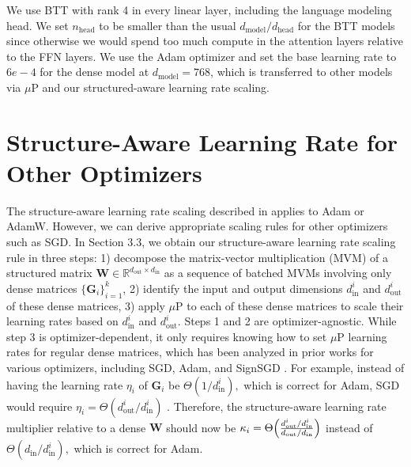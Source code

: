 \documentclass{article}
\newcommand{\mbf}[1]{{\boldsymbol{\mathbf{#1}}}}
\newcommand{\bm}{\mbf}
\theoremstyle{plain}
\theoremstyle{definition}
\theoremstyle{remark}
\newcommand{\mup}{$\mu$P\xspace}
\newcommand{\R}{\mathbb{R}}
\newcommand{\din}{{d_\mathrm{in}}}
\newcommand{\dout}{{d_\mathrm{out}}}
\begin{document}
We use BTT with rank 4 in every linear layer, including the language modeling head. We set $n_\mathrm{head}$ to be smaller than the usual $d_\mathrm{model} / d_\mathrm{head}$ for the BTT models since otherwise we would spend too much compute in the attention layers relative to the FFN layers.  We use the Adam optimizer and set the base learning rate to $6e-4$ for the dense model at $d_\mathrm{model}=768$, which is transferred to other models via \mup and our structured-aware learning rate scaling.

\section{Structure-Aware Learning Rate for Other Optimizers} \label{app:other_opt}
The structure-aware learning rate scaling described in  applies to Adam or AdamW. However, we can derive appropriate scaling rules for other optimizers such as SGD. In Section 3.3, we obtain our structure-aware learning rate scaling rule in three steps: 1) decompose the matrix-vector multiplication (MVM) of a structured matrix $\bm{W} \in \R^{\dout \times \din}$ as a sequence of batched MVMs involving only dense matrices $\{\bm{G}_i\}_{i=1}^{k}$, 2) identify the input and output dimensions $d^i_\mathrm{in}$ and $d^i_\mathrm{out}$  of these dense matrices, 3) apply \mup to each of these dense matrices to scale their learning rates based on $d^i_\mathrm{in}$ and $d^i_\mathrm{out}$. Steps 1 and 2 are optimizer-agnostic. While step 3 is optimizer-dependent, it only requires knowing how to set \mup learning rates for regular dense matrices, which has been analyzed in prior works for various optimizers, including SGD, Adam, and SignSGD \citep{yang2023iv, yang2023spectral}. For example, instead of having the learning rate $\eta_i$ of $\bm{G}_i$ be $\Theta(1/d^i_\mathrm{in}),$ which is correct for Adam, SGD would require $\eta_i = \Theta(d^i_\mathrm{out} / d^i_\mathrm{in})$ \citep{yang2023spectral}. Therefore, the structure-aware learning rate multiplier relative to a dense $\bm{W}$ should now be $\kappa_i = \Theta\qty(\frac{d^i_\mathrm{out} / d^i_\mathrm{in}}{\dout / \din})$ instead of $\Theta(\din/d^i_\mathrm{in}),$ which is correct for Adam.
\end{document}

